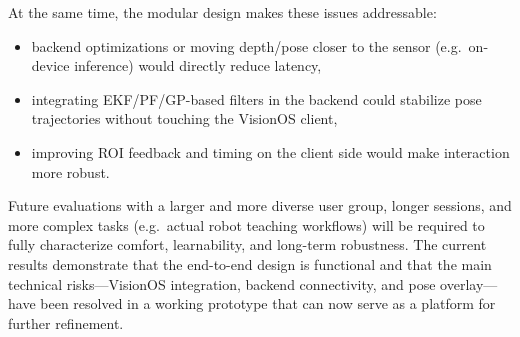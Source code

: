 At the same time, the modular design makes these issues addressable:

\begin{itemize}
    \item backend optimizations or moving depth/pose closer to the sensor (e.g.\ on-device inference) would directly reduce latency,
    \item integrating EKF/PF/GP-based filters in the backend could stabilize pose trajectories without touching the VisionOS client,
    \item improving ROI feedback and timing on the client side would make interaction more robust.
\end{itemize}

Future evaluations with a larger and more diverse user group, longer sessions, and more complex tasks (e.g.\ actual robot teaching workflows) will be required to fully characterize comfort, learnability, and long-term robustness. The current results demonstrate that the end-to-end design is functional and that the main technical risks—VisionOS integration, backend connectivity, and pose overlay—have been resolved in a working prototype that can now serve as a platform for further refinement.
